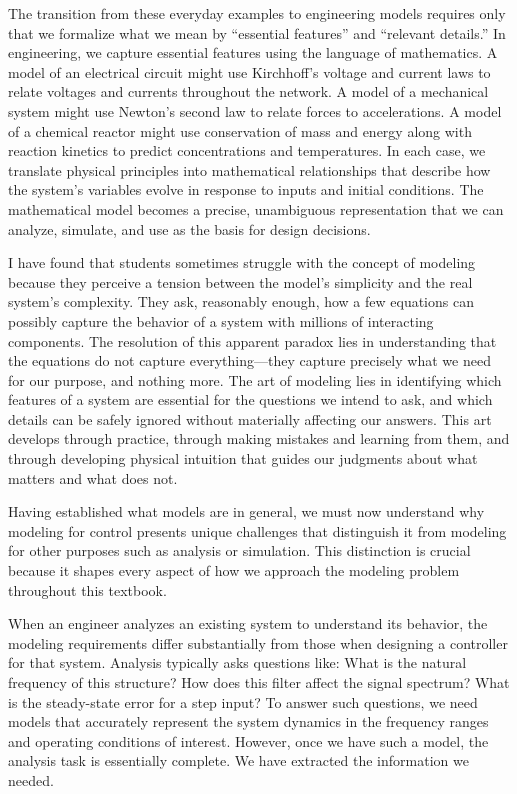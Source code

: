 The transition from these everyday examples to engineering models requires only that we formalize what we mean by ``essential features'' and ``relevant details.'' In engineering, we capture essential features using the language of mathematics. A model of an electrical circuit might use Kirchhoff's voltage and current laws to relate voltages and currents throughout the network. A model of a mechanical system might use Newton's second law to relate forces to accelerations. A model of a chemical reactor might use conservation of mass and energy along with reaction kinetics to predict concentrations and temperatures. In each case, we translate physical principles into mathematical relationships that describe how the system's variables evolve in response to inputs and initial conditions. The mathematical model becomes a precise, unambiguous representation that we can analyze, simulate, and use as the basis for design decisions.

I have found that students sometimes struggle with the concept of modeling because they perceive a tension between the model's simplicity and the real system's complexity. They ask, reasonably enough, how a few equations can possibly capture the behavior of a system with millions of interacting components. The resolution of this apparent paradox lies in understanding that the equations do not capture everything---they capture precisely what we need for our purpose, and nothing more. The art of modeling lies in identifying which features of a system are essential for the questions we intend to ask, and which details can be safely ignored without materially affecting our answers. This art develops through practice, through making mistakes and learning from them, and through developing physical intuition that guides our judgments about what matters and what does not.


Having established what models are in general, we must now understand why modeling for control presents unique challenges that distinguish it from modeling for other purposes such as analysis or simulation. This distinction is crucial because it shapes every aspect of how we approach the modeling problem throughout this textbook.

When an engineer analyzes an existing system to understand its behavior, the modeling requirements differ substantially from those when designing a controller for that system. Analysis typically asks questions like: What is the natural frequency of this structure? How does this filter affect the signal spectrum? What is the steady-state error for a step input? To answer such questions, we need models that accurately represent the system dynamics in the frequency ranges and operating conditions of interest. However, once we have such a model, the analysis task is essentially complete. We have extracted the information we needed.

